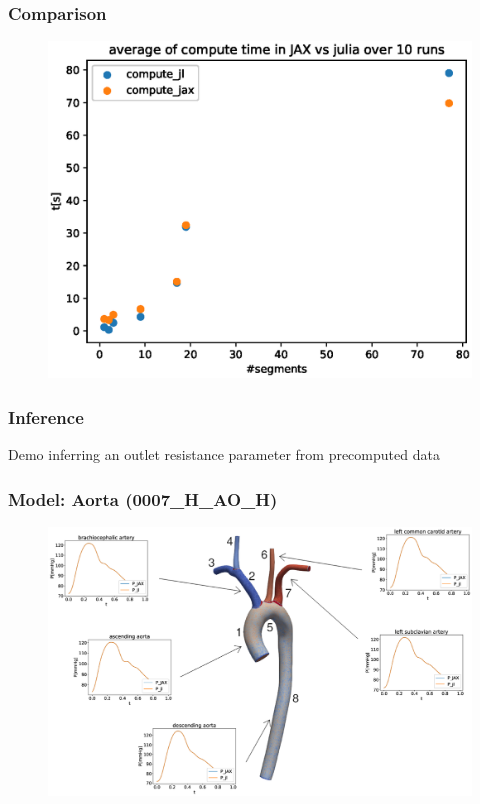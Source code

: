\documentclass{beamer}
\begin{document}
\begin{frame}
	\frametitle{Comparison}
	\begin{figure} [H]
		\centering
		\includegraphics[width=0.94\columnwidth]{images/comparison.eps}
		\label{fig:comparison}
	\end{figure}

\end{frame}
\begin{frame}
	\frametitle{Inference}
	\begin{block}{Demo}
		inferring an outlet resistance parameter from precomputed data
	\end{block}
\end{frame}
\begin{frame}
	\frametitle{Model: Aorta (0007\_H\_AO\_H)}
	\begin{figure} [H]
		\centering
		\includegraphics[width=\columnwidth]{images/0007.eps}
		\label{fig:aorta}
	\end{figure}
\end{frame}
\end{document}
